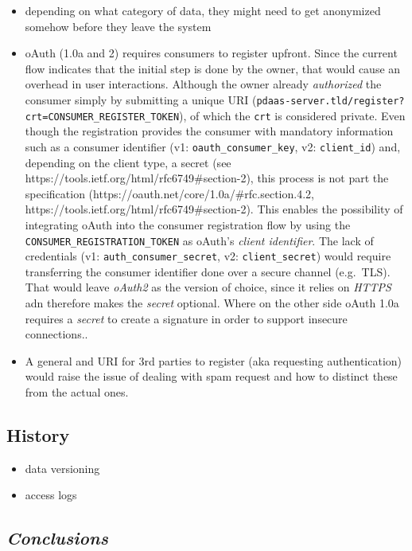 \documentclass[12pt,english,a4paper,titlepage,cleardoublepage=empty,dottedtoc]{report}
\providecommand{\tightlist}{%
  \setlength{\itemsep}{0pt}\setlength{\parskip}{0pt}}
\begin{document}
\begin{itemize}
\item
  depending on what category of data, they might need to get anonymized
  somehow before they leave the system
\item
  oAuth (1.0a and 2) requires consumers to register upfront. Since the
  current flow indicates that the initial step is done by the owner,
  that would cause an overhead in user interactions. Although the owner
  already \emph{authorized} the consumer simply by submitting a unique
  URI
  (\texttt{pdaas-server.tld/register?crt=CONSUMER\_REGISTER\_TOKEN}), of
  which the \texttt{crt} is considered private. Even though the
  registration provides the consumer with mandatory information such as
  a consumer identifier (v1: \texttt{oauth\_consumer\_key}, v2:
  \texttt{client\_id}) and, depending on the client type, a secret (see
  https://tools.ietf.org/html/rfc6749\#section-2), this process is not
  part the specification (https://oauth.net/core/1.0a/\#rfc.section.4.2,
  https://tools.ietf.org/html/rfc6749\#section-2). This enables the
  possibility of integrating oAuth into the consumer registration flow
  by using the \texttt{CONSUMER\_REGISTRATION\_TOKEN} as oAuth's
  \emph{client identifier}. The lack of credentials (v1:
  \texttt{auth\_consumer\_secret}, v2: \texttt{client\_secret}) would
  require transferring the consumer identifier done over a secure
  channel (e.g.~TLS). That would leave \emph{oAuth2} as the version of
  choice, since it relies on \emph{HTTPS} adn therefore makes the
  \emph{secret} optional. Where on the other side oAuth 1.0a requires a
  \emph{secret} to create a signature in order to support insecure
  connections..
\item
  A general and URI for 3rd parties to register (aka requesting
  authentication) would raise the issue of dealing with spam request and
  how to distinct these from the actual ones.
\end{itemize}

\subsection{History}\label{history}

\begin{itemize}
\tightlist
\item
  data versioning
\item
  access logs
\end{itemize}

\subsection{\texorpdfstring{\emph{Conclusions}}{Conclusions}}\label{conclusions}
\end{document}
